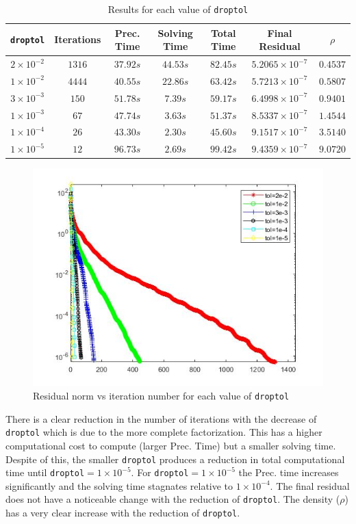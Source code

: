 \documentclass[a4paper, 11pt]{article}
\begin{document}
			\begin{table}[H]
				\centering
				\begin{tabular}{c|c|c|c|c|c|c}
					\textbf{\texttt{droptol}} & \textbf{Iterations} & \textbf{Prec. Time}  & \textbf{Solving Time}  & \textbf{Total Time} & \textbf{Final Residual} & \textbf{$ \rho $} \\ \hline
					$2 \times 10^{-2}$ & $1316$	& $ 37.92 s $ 	& $ 44.53 s $ & $ 82.45 s $ 	& $ 5.2065 \times 10^{-7} $ & $ 0.4537 $\\ \hline
					$1 \times 10^{-2}$ & $4444$	& $ 40.55 s $ 	& $ 22.86 s $ & $ 63.42 s $ 	& $ 5.7213 \times 10^{-7} $ & $ 0.5807 $\\ \hline
					$3 \times 10^{-3}$ & $150$	& $ 51.78 s $ 	& $ 7.39 s $ & $ 59.17 s $ 		& $ 6.4998 \times 10^{-7} $ & $ 0.9401 $\\ \hline
					$1 \times 10^{-3}$ & $67$	& $ 47.74 s $ 	& $ 3.63 s $ & $ 51.37 s $ 		& $ 8.5337 \times 10^{-7} $ & $ 1.4544 $\\ \hline
					$1 \times 10^{-4}$ & $26$	& $ 43.30 s $ 	& $ 2.30 s $ & $ 45.60 s $ 		& $ 9.1517 \times 10^{-7} $ & $ 3.5140 $\\ \hline
					$1 \times 10^{-5}$ & $12$	& $ 96.73 s $ 	& $ 2.69 s $ & $ 99.42 s $ 		& $ 9.4359 \times 10^{-7} $ & $ 9.0720 $\\
				\end{tabular}
				\caption{Results for each value of \texttt{droptol}}
				\label{table:ex8}
			\end{table}
			
			\begin{figure}[H]
				\centering
				\includegraphics[width=.6\linewidth]{ex8.jpg}
				\caption{Residual norm vs iteration number for each value of \texttt{droptol}}
				\label{fig:ex8}
			\end{figure}
		
			There is a clear reduction in the number of iterations with the decrease of \texttt{droptol} which is due to the more complete factorization.
			This has a higher computational cost to compute (larger Prec. Time) but a smaller solving time.
			Despite of this, the smaller \texttt{droptol} produces a reduction in total computational time until \texttt{droptol}$ = 1\times 10^{-5}$.
			For \texttt{droptol}$  = 1\times 10^{-5} $ the Prec. time increases significantly and the solving time stagnates relative to $ 1\times 10^{-4} $.  
			The final residual does not have a noticeable change with the reduction of \texttt{droptol}.
			The density ($ \rho $) has a very clear increase with the reduction of \texttt{droptol}.			
	
\end{document}

